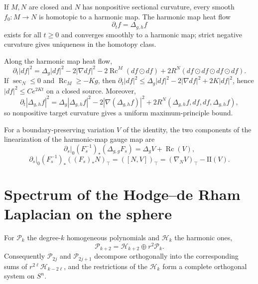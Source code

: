 \begin{theorem}
\label{thm:chow-iv-k17-eells-sampson}
If $M,N$ are closed and $N$ has nonpositive sectional curvature, every smooth
$f_0:M\to N$ is homotopic to a harmonic map.  The harmonic map heat flow
\[
\partial_tf=\Delta_{g,h}f
\]
exists for all $t\ge0$ and converges smoothly to a harmonic map; strict
negative curvature gives uniqueness in the homotopy class.
\end{theorem}

\begin{lemma}
\label{lem:chow-iv-k18-energy-density}
Along the harmonic map heat flow,
\[
\partial_t|df|^2=\Delta_g|df|^2-2|\nabla df|^2
-2\operatorname{Rc}^M(df\odot df)+2R^N(df\odot df\odot df\odot df).
\]
If $\sec_N\le0$ and $\operatorname{Rc}_M\ge-Kg$, then
$\partial_t|df|^2\le\Delta_g|df|^2-2|\nabla df|^2+2K|df|^2$, hence
$|df|^2\le Ce^{2Kt}$ on a closed source.  Moreover,
\[
\partial_t|\Delta_{g,h}f|^2
=\Delta_g|\Delta_{g,h}f|^2-2|\nabla(\Delta_{g,h}f)|^2
+2R^N(\Delta_{g,h}f,df,df,\Delta_{g,h}f),
\]
so nonpositive target curvature gives a uniform maximum-principle bound.
\end{lemma}

\begin{remark}
\label{rem:chow-iv-k-linearization-boundary}
For a boundary-preserving variation $V$ of the identity, the two components of
the linearization of the harmonic-map gauge map are
\[
\left.\partial_s\right|_0(F_s^{-1})_*(\Delta_{g,g}F_s)=\Delta_gV+\operatorname{Rc}(V),
\]
\[
\left.\partial_s\right|_0(F_s^{-1})_*((F_s)_*N)_\top
=([N,V])_\top=(\nabla_NV)_\top-\mathrm{II}(V).
\]
\end{remark}

\section{Spectrum of the Hodge--de Rham Laplacian on the sphere}

\begin{proposition}
\label{prop:chow-iv-k19-harmonic-polynomial-decomposition}
For $\mathcal P_k$ the degree-$k$ homogeneous polynomials and $\mathcal H_k$
the harmonic ones,
\[
\mathcal P_{k+2}=\mathcal H_{k+2}\oplus r^2\mathcal P_k.
\]
Consequently $\mathcal P_{2j}$ and $\mathcal P_{2j+1}$ decompose orthogonally
into the corresponding sums of $r^{2\ell}\mathcal H_{k-2\ell}$, and the
restrictions of the $\mathcal H_k$ form a complete orthogonal system on $S^n$.
\end{proposition}

